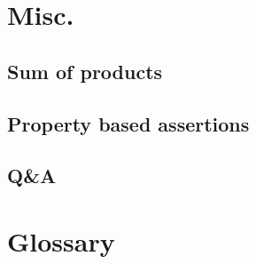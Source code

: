 \documentclass{article}
\begin{document}
    \section{Misc.}
        \subsection{Sum of products}
        \subsection{Property based assertions}
        \subsection{Q\&A}

    \appendix
    \section{Glossary}
    \printnoidxglossaries
\end{document}
